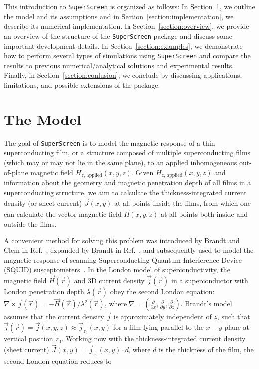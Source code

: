\documentclass[final,3p,times]{elsarticle}
\newcommand{\inline}[1]{\texttt{#1}\xspace}
\newcommand{\SuperScreen}{\inline{SuperScreen}}
\newcounter{bla}
\begin{document}
This introduction to \SuperScreen is organized as follows: In Section~\ref{section:model}, we outline the model and its assumptions and in Section~\ref{section:implementation}, we describe its numerical implementation. In Section~\ref{section:overview}, we provide an overview of the structure of the \SuperScreen package and discuss some important development details. In Section~\ref{section:examples}, we demonstrate how to perform several types of simulations using \SuperScreen and compare the results to previous numerical/analytical solutions and experimental results. Finally, in Section~\ref{section:conlusion}, we conclude by discussing applications, limitations, and possible extensions of the package.

\section{The Model}
\label{section:model}

The goal of \SuperScreen is to model the magnetic response of a thin superconducting film, or a structure composed of multiple superconducting films (which may or may not lie in the same plane), to an applied inhomogeneous out-of-plane magnetic field
$H_{z,\,\mathrm{applied}}(x, y, z)$. Given $H_{z,\,\mathrm{applied}}(x, y, z)$ and information about the geometry and magnetic penetration depth of all films in a superconducting structure, we aim to calculate the thickness-integrated current density (or sheet current) $\vec{J}(x, y)$ at all points inside the films, from which one can calculate the vector magnetic field $\vec{H}(x, y, z)$ at all points both inside and outside the films.

A convenient method for solving this problem was introduced by Brandt and Clem in Ref.~\cite{Brandt2004-ew}, expanded by Brandt in Ref.~\cite{Brandt2005-wj}, and subsequently used to model the magnetic response of scanning Superconducting Quantum Interference Device (SQUID) susceptometers~\cite{Kirtley2016-zz, Kirtley2016-gt}. In the London model of superconductivity, the magnetic field $\vec{H}(\vec{r})$ and 3D current density $\vec{j}(\vec{r})$ in a superconductor with London penetration depth $\lambda(\vec{r})$ obey the second London equation:
$\nabla\times\vec{j}(\vec{r})=-\vec{H}(\vec{r})/\lambda^2(\vec{r})$, where
$\nabla=\left(\frac{\partial}{\partial x}, \frac{\partial}{\partial y}, \frac{\partial}{\partial z}\right)$. Brandt's model assumes that the current density $\vec{j}$ is approximately independent of $z$, such that  $\vec{j}(\vec{r}) = \vec{j}(x, y, z)\approx\vec{j}_{z_0}(x, y)$ for a film lying parallel to the $x-y$ plane at vertical position $z_0$. Working now with the thickness-integrated current density (sheet current) $\vec{J}(x, y)=\vec{j}_{z_0}(x, y)\cdot d$, where $d$
is the thickness of the film, the second London equation reduces to
\end{document}
